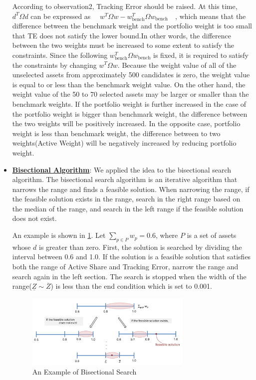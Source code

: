 \documentclass[11pt]{article}
\begin{document}
\begin{itemize}
	According to observation2, Tracking Error should be raised. At this time, $d^T\Omega d$ can be expressed as $\quad w^T\Omega  w - w_{\text{bench}}^T\Omega  w_{\text{bench}} \quad$, which means that the difference between the benchmark weight and the portfolio weight is too small that TE does not satisfy the lower bound.In other words, the difference between the two weights must be increased to some extent to satisfy the constraints. Since the following $  w_{\text{bench}}^T\Omega  w_{\text{bench}}  $ is fixed, it is required to satisfy the constraints by changing $w^T\Omega  w $. 
	Because the weight value of all of the unselected assets from approximately 500 candidates is zero, the weight value is equal to or less than the benchmark weight value. On the other hand, the weight value of the 50 to 70 selected assets may be larger or smaller than the benchmark weights. If the portfolio weight is further increased in the case of the portfolio weight is bigger than benchmark weight, the difference between the two weights will be positively increased. In the opposite case, portfolio weight is less than benchmark weight, the difference between to two weights(Active Weight) will be negatively increased by reducing portfolio weight.
	\item[] \underline{\textbf{Bisectional Algorithm}}:
	 We applied the idea to the bisectional search algorithm.  The bisectional search algorithm is an iterative algorithm that narrows the range and finds a feasible solution. When narrowing the range, if the feasible solution exists in the range, search in the right range based on the median of the range, and search in the left range if the feasible solution does not exist.
	
	An example is shown in \ref{fig:bisection}. Let  $ \sum_{p\in P} w_p = 0.6$, where $P$ is a set of assets whose $d$ is greater than zero. First, the solution is searched by dividing the interval between 0.6 and 1.0. If the solution is a feasible solution that satisfies both the range of Active Share and Tracking Error, narrow the range and search again in the left section.  The search is stopped when the width of the range($\underline{Z} \sim \overline{Z}$) is less than the end condition which is set to 0.001. 
	
	\begin{figure}[h] 
		\begin{center}
			\includegraphics[width=0.75\textwidth]{bisection}
			\caption{An Example of Bisectional Search} \label{fig:bisection}
		\end{center}
	\end{figure}


\end{itemize}
\end{document}
